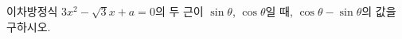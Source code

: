 이차방정식 $3x^{2}-\sqrt{3}x+a=0$의 두 근이 $\sin\theta$, $\cos\theta$일 때, $\cos\theta-\sin\theta$의 값을 구하시오. 
